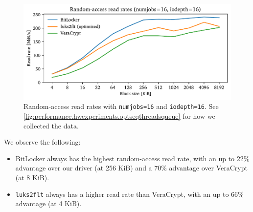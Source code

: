 \begin{figure}[htb!]
	\center
	\includegraphics[scale=1]{../fig/performance.hwexperiments.optrandthreadsqueue.pdf}
	\caption[
		Random-access read rates with \texttt{numjobs=16} and \texttt{iodepth=16}
	]{
		Random-access read rates with \texttt{numjobs=16} and \texttt{iodepth=16}. See \autoref{fig:performance.hwexperiments.optseqthreadsqueue} for how we collected the data.
	}
	\label{fig:performance.hwexperiments.optrandthreadsqueue}
\end{figure}

We observe the following:
\begin{itemize}[beginpenalty=10000]
	\item BitLocker always has the highest random-access read rate, with an up to 22\% advantage over our driver (at 256 KiB) and a 70\% advantage over VeraCrypt (at 8 KiB).
	\item \texttt{luks2flt} always has a higher read rate than VeraCrypt, with an up to 66\% advantage (at 4 KiB).
\end{itemize}

